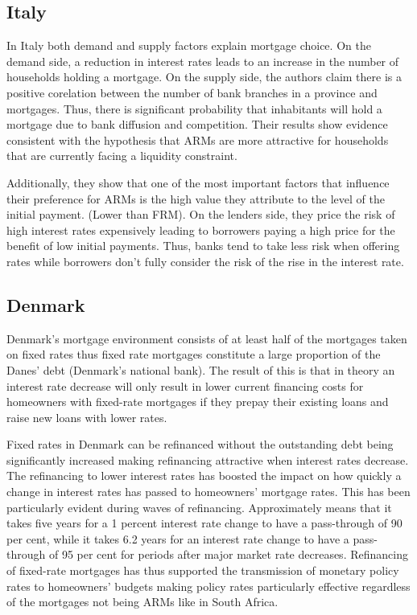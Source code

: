 \documentclass[
  letterpaper,
  DIV=11,
  numbers=noendperiod]{scrartcl}
\begin{document}
\subsection{Italy}\label{italy}

In Italy both demand and supply factors explain mortgage choice. On the
demand side, a reduction in interest rates leads to an increase in the
number of households holding a mortgage. On the supply side, the authors
claim there is a positive corelation between the number of bank branches
in a province and mortgages. Thus, there is significant probability that
inhabitants will hold a mortgage due to bank diffusion and competition.
Their results show evidence consistent with the hypothesis that ARMs are
more attractive for households that are currently facing a liquidity
constraint.

Additionally, they show that one of the most important factors that
influence their preference for ARMs is the high value they attribute to
the level of the initial payment. (Lower than FRM). On the lenders side,
they price the risk of high interest rates expensively leading to
borrowers paying a high price for the benefit of low initial payments.
Thus, banks tend to take less risk when offering rates while borrowers
don't fully consider the risk of the rise in the interest rate.

\subsection{Denmark}\label{denmark}

Denmark's mortgage environment consists of at least half of the
mortgages taken on fixed rates thus fixed rate mortgages constitute a
large proportion of the Danes' debt (Denmark's national bank). The
result of this is that in theory an interest rate decrease will only
result in lower current financing costs for homeowners with fixed-rate
mortgages if they prepay their existing loans and raise new loans with
lower rates.

Fixed rates in Denmark can be refinanced without the outstanding debt
being significantly increased making refinancing attractive when
interest rates decrease. The refinancing to lower interest rates has
boosted the impact on how quickly a change in interest rates has passed
to homeowners' mortgage rates. This has been particularly evident during
waves of refinancing. Approximately means that it takes five years for a
1 percent interest rate change to have a pass-through of 90 per cent,
while it takes 6.2 years for an interest rate change to have a
pass-through of 95 per cent for periods after major market rate
decreases. Refinancing of fixed-rate mortgages has thus supported the
transmission of monetary policy rates to homeowners' budgets making
policy rates particularly effective regardless of the mortgages not
being ARMs like in South Africa.
\end{document}
